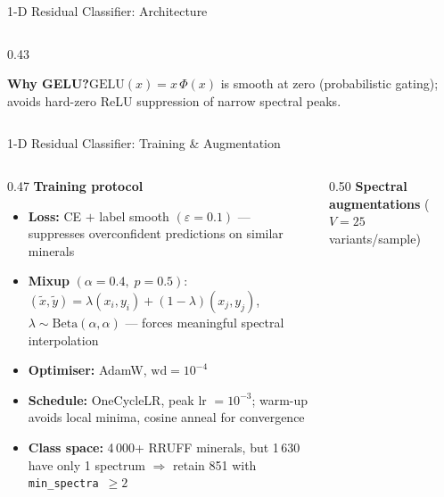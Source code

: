 \documentclass[aspectratio=169,10pt]{beamer}
\begin{document}
\begin{frame}{1-D Residual Classifier: Architecture}
\begin{columns}[T]
\begin{column}{0.43\textwidth}
      \vspace{0.07cm}
      \begin{tcolorbox}[notebox, top=2pt, bottom=2pt]
        \scriptsize\textbf{Why GELU?}\enspace$\mathrm{GELU}(x)=x\,\Phi(x)$
        is smooth at zero (probabilistic gating); avoids hard-zero
        ReLU suppression of narrow spectral peaks.
      \end{tcolorbox}
    \end{column}
  \end{columns}
\end{frame}

\begin{frame}{1-D Residual Classifier: Training \& Augmentation}
  \begin{columns}[T]
    \begin{column}{0.47\textwidth}
      \textbf{Training protocol}
      \begin{itemize}\setlength\itemsep{0.05cm}\footnotesize
        \item \textbf{Loss:} CE $+$ label smooth $(\varepsilon{=}0.1)$
              --- suppresses overconfident predictions on similar minerals
        \item \textbf{Mixup} $(\alpha{=}0.4,\;p{=}0.5)$:
              $(\tilde{x},\tilde{y})=\lambda(x_i,y_i)+(1{-}\lambda)(x_j,y_j)$,\;
              $\lambda\!\sim\!\mathrm{Beta}(\alpha,\alpha)$
              --- forces meaningful spectral interpolation
        \item \textbf{Optimiser:} AdamW, $\mathrm{wd}{=}10^{-4}$
        \item \textbf{Schedule:} OneCycleLR, peak lr $= 10^{-3}$;
              warm-up avoids local minima, cosine anneal for convergence
        \item \textbf{Class space:} 4\,000+ RRUFF minerals, but
              1\,630 have only 1 spectrum
              $\Rightarrow$ retain 851 with \texttt{min\_spectra}~$\ge2$
      \end{itemize}
    \end{column}
    \begin{column}{0.50\textwidth}
      \textbf{Spectral augmentations} ($V=25$ variants/sample)


\end{column}
\end{columns}
\end{frame}
\end{document}
